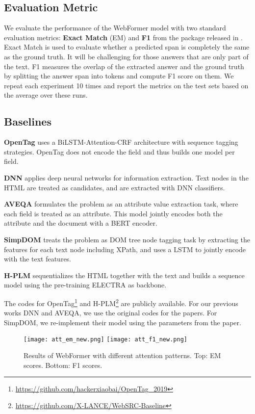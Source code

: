 \documentclass[sigconf]{acmart}
\begin{document}
\subsection{Evaluation Metric}
We evaluate the performance of the WebFormer model with two standard evaluation metrics: \textbf{Exact Match} (EM) and \textbf{F1} from the package released in \cite{squad}.
Exact Match is used to evaluate whether a predicted span is completely the same as the ground truth. It will be challenging for those answers that are only part of the text. F1 measures the overlap of the extracted answer and the ground truth by splitting the answer span into tokens and compute F1 score on them. We repeat each experiment 10 times and report the metrics on the test sets based on the average over these runs.

\subsection{Baselines}
\noindent\textbf{OpenTag} \cite{ZhengMD018} uses a BiLSTM-Attention-CRF architecture with sequence tagging strategies. OpenTag does not encode the field and thus builds one model per field.

\noindent\textbf{DNN} \cite{WangKGS19} applies deep neural networks for information extraction. Text nodes in the HTML are treated as candidates, and are extracted with DNN classifiers.

\noindent\textbf{AVEQA} \cite{WangYKSSSYE20} formulates the problem as an attribute value extraction task, where each field is treated as an attribute. This model jointly encodes both the attribute and the document with a BERT \cite{DevlinCLT19} encoder.

\noindent\textbf{SimpDOM} \cite{abs-2101-02415} treats the problem as DOM tree node tagging task by extracting the features for each text node including XPath, and uses a LSTM to jointly encode with the text features.

\noindent\textbf{H-PLM} \cite{abs-2101-09465} sequentializes the HTML together with the text and builds a sequence model using the pre-training ELECTRA \cite{ClarkLLM20} as backbone.

The codes for OpenTag\footnote{\url{https://github.com/hackerxiaobai/OpenTag_2019}} and H-PLM\footnote{\url{https://github.com/X-LANCE/WebSRC-Baseline}} are publicly available. For our previous works DNN and AVEQA, we use the original codes for the papers. For SimpDOM, we re-implement their model using the parameters from the paper.
\begin{figure}
\centering
\texttt{[image: att\_em\_new.png]}
\texttt{[image: att\_f1\_new.png]}
\caption{Results of WebFormer with different attention patterns. Top: EM scores. Bottom: F1 scores.} \label{fig:att}
\end{figure}
\end{document}

